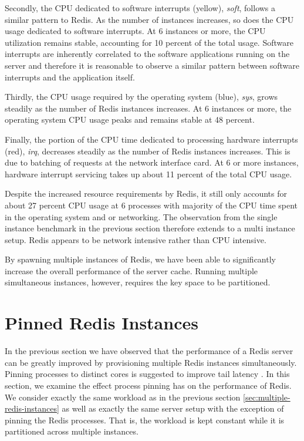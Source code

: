 Secondly, the CPU dedicated to software interrupts (yellow), \textit{soft}, follows a similar pattern to Redis. As the number of instances increases, so does the CPU usage dedicated to software interrupts. At 6 instances or more, the CPU utilization remains stable, accounting for 10 percent of the total usage. Software interrupts are inherently correlated to the software applications running on the server and therefore it is reasonable to observe a similar pattern between software interrupts and the application itself.

Thirdly, the CPU usage required by the operating system (blue), \textit{sys}, grows steadily as the number of Redis instances increases. At 6 instances or more, the operating system CPU usage peaks and remains stable at 48 percent.

Finally, the portion of the CPU time dedicated to processing hardware interrupts (red), \textit{irq}, decreases steadily as the number of Redis instances increases. This is due to batching of requests at the network interface card. At 6 or more instances, hardware interrupt servicing takes up about 11 percent of the total CPU usage.

Despite the increased resource requirements by Redis, it still only accounts for about 27 percent CPU usage at 6 processes with majority of the CPU time spent in the operating system and or networking. The observation from the single instance benchmark in the previous section therefore extends to a multi instance setup. Redis appears to be network intensive rather than CPU intensive.


By spawning multiple instances of Redis, we have been able to significantly increase the overall performance of the server cache. Running multiple simultaneous instances, however, requires the key space to be partitioned.


\section{Pinned Redis Instances}

In the previous section we have observed that the performance of a Redis server can be greatly improved by provisioning multiple Redis instances simultaneously. Pinning processes to distinct cores is suggested to improve tail latency \cite{leverich2014reconciling}. In this section, we examine the effect process pinning has on the performance of Redis. We consider exactly the same workload as in the previous section \ref{sec:multiple-redis-instances} as well as exactly the same server setup with the exception of pinning the Redis processes. That is, the workload is kept constant while it is partitioned across multiple instances.

